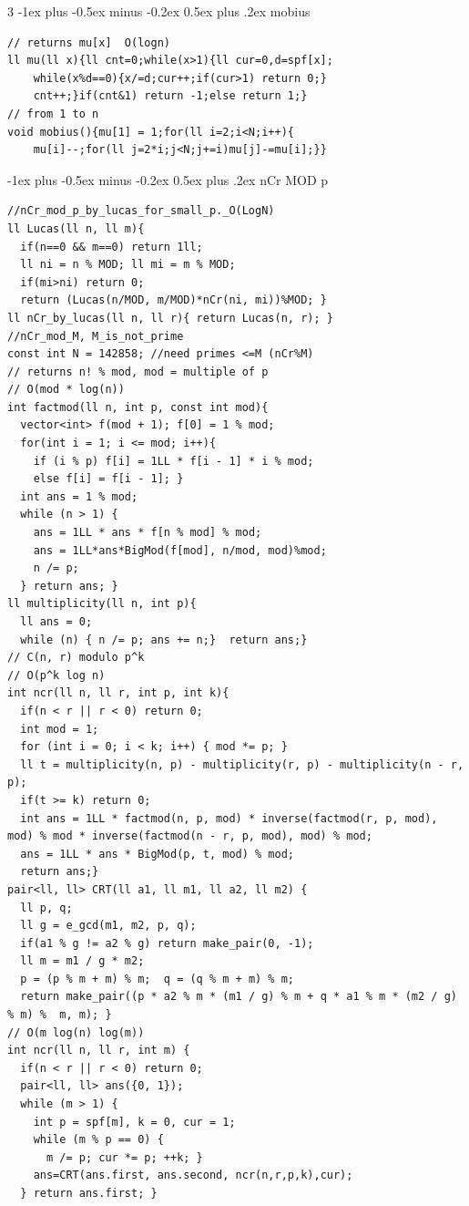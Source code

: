 \documentclass[8pt,a4paper,onesided]{article}
\makeatletter
\renewcommand{\subsection}{\@startsection{subsection}{2}{0mm}
    {-1ex plus -0.5ex minus -0.2ex} %
    {0.5ex plus .2ex}                %
    {\normalfont\large\bfseries}}    %
\makeatother
\begin{document}
\begin{multicols}{3}
\subsection{mobius}
\begin{verbatim}
// returns mu[x]  O(logn)
ll mu(ll x){ll cnt=0;while(x>1){ll cur=0,d=spf[x];
    while(x%d==0){x/=d;cur++;if(cur>1) return 0;}
    cnt++;}if(cnt&1) return -1;else return 1;}
// from 1 to n
void mobius(){mu[1] = 1;for(ll i=2;i<N;i++){
    mu[i]--;for(ll j=2*i;j<N;j+=i)mu[j]-=mu[i];}}
\end{verbatim}
\subsection{nCr MOD p}
\begin{verbatim}
//nCr_mod_p_by_lucas_for_small_p._O(LogN)
ll Lucas(ll n, ll m){
  if(n==0 && m==0) return 1ll;
  ll ni = n % MOD; ll mi = m % MOD;
  if(mi>ni) return 0;
  return (Lucas(n/MOD, m/MOD)*nCr(ni, mi))%MOD; }
ll nCr_by_lucas(ll n, ll r){ return Lucas(n, r); }
//nCr_mod_M, M_is_not_prime
const int N = 142858; //need primes <=M (nCr%M)
// returns n! % mod, mod = multiple of p
// O(mod * log(n))
int factmod(ll n, int p, const int mod){
  vector<int> f(mod + 1); f[0] = 1 % mod;
  for(int i = 1; i <= mod; i++){
    if (i % p) f[i] = 1LL * f[i - 1] * i % mod;
    else f[i] = f[i - 1]; }
  int ans = 1 % mod;
  while (n > 1) {
    ans = 1LL * ans * f[n % mod] % mod;
    ans = 1LL*ans*BigMod(f[mod], n/mod, mod)%mod;
    n /= p;
  } return ans; }
ll multiplicity(ll n, int p){
  ll ans = 0;
  while (n) { n /= p; ans += n;}  return ans;}
// C(n, r) modulo p^k
// O(p^k log n)
int ncr(ll n, ll r, int p, int k){
  if(n < r || r < 0) return 0;
  int mod = 1;
  for (int i = 0; i < k; i++) { mod *= p; }
  ll t = multiplicity(n, p) - multiplicity(r, p) - multiplicity(n - r, p);
  if(t >= k) return 0;
  int ans = 1LL * factmod(n, p, mod) * inverse(factmod(r, p, mod), mod) % mod * inverse(factmod(n - r, p, mod), mod) % mod;
  ans = 1LL * ans * BigMod(p, t, mod) % mod;
  return ans;}
pair<ll, ll> CRT(ll a1, ll m1, ll a2, ll m2) {
  ll p, q;
  ll g = e_gcd(m1, m2, p, q);
  if(a1 % g != a2 % g) return make_pair(0, -1);
  ll m = m1 / g * m2;
  p = (p % m + m) % m;  q = (q % m + m) % m;
  return make_pair((p * a2 % m * (m1 / g) % m + q * a1 % m * (m2 / g) % m) %  m, m); }
// O(m log(n) log(m))
int ncr(ll n, ll r, int m) {
  if(n < r || r < 0) return 0;
  pair<ll, ll> ans({0, 1});
  while (m > 1) {
    int p = spf[m], k = 0, cur = 1;
    while (m % p == 0) {
      m /= p; cur *= p; ++k; }
    ans=CRT(ans.first, ans.second, ncr(n,r,p,k),cur);
  } return ans.first; }
\end{verbatim}

\end{multicols}
\end{document}
